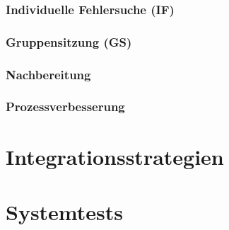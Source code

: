 \documentclass[a4paper]{article}
\theoremstyle{break}
\begin{document}
\subsubsection{Individuelle Fehlersuche (IF)}
\subsubsection{Gruppensitzung (GS)}
\subsubsection{Nachbereitung}
\subsubsection{Prozessverbesserung}
\section{Integrationsstrategien}
\section{Systemtests}
\end{document}
